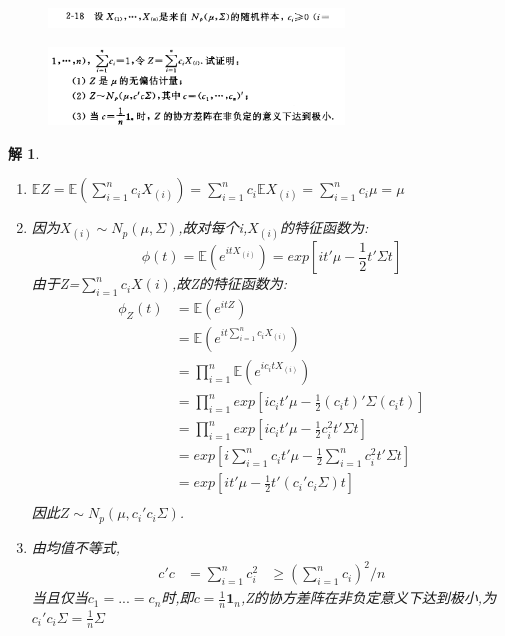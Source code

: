 \documentclass[11pt,a4paper]{ctexart}
\newtheorem*{solution}{解}
\begin{document}
\begin{figure}[H]
	\includegraphics[width=0.7\textwidth]{3.png}
\end{figure}
\begin{figure}[H]
	\includegraphics[width=0.7\textwidth]{4.png}
\end{figure}
\begin{solution}
\begin{enumerate}
	\item [(1)] 
	$ \mathbb{E}Z= \mathbb{E}(\sum_{i=1}^{n}c_iX_{(i)})=\sum_{i=1}^{n}c_i\mathbb{E}X_{(i)}=\sum_{i=1}^{n}c_i\mu=\mu$
	\item [(2)] 因为$ X_{(i)}\sim N_p(\mu,\Sigma) $,故对每个i,$ X_{(i)} $的特征函数为:
	\begin{equation}
	\phi(t)=\mathbb{E}(e^{itX_{(i)}})=exp\left[ it'\mu-\frac{1}{2}t'\Sigma t\right] 
	\end{equation}
	由于Z=$\sum_{i=1}^{n}c_iX(i) $,故Z的特征函数为:
	\begin{equation}
	\begin{aligned}
	\phi_Z(t) &=\mathbb{E}(e^{itZ})\\
	&= \mathbb{E}(e^{it\sum_{i=1}^{n}c_iX_{(i)}})\\
	&= \prod_{i=1}^{n}\mathbb{E}(e^{ic_itX_{(i)}})\\
	&= \prod_{i=1}^{n}exp\left[ ic_it'\mu-\frac{1}{2}(c_it)'\Sigma (c_it)\right] \\
	&= \prod_{i=1}^{n}exp\left[ ic_it'\mu-\frac{1}{2}c_i^2t'\Sigma t\right] \\
	&= exp\left[ i\sum_{i=1}^{n}c_it'\mu-\frac{1}{2}\sum_{i=1}^{n}c_i^2t'\Sigma t\right] \\
	&= exp\left[ it'\mu-\frac{1}{2}t'(c_i'c_i\Sigma )t\right] \\
	\end{aligned}
	\end{equation}
因此$ Z\sim N_p(\mu,c_i'c_i\Sigma) $.
	\item [(3)] 由均值不等式,
		\begin{equation}
		\begin{aligned}
		c'c &= \sum_{i=1}^{n}c_i^2
		&\geq (\sum_{i=1}^{n}c_i)^2/n
		\end{aligned}
    	\end{equation}
	当且仅当$ c_1=...=c_n $时,即$ c=\frac{1}{n}\textbf{1}_n $,Z的协方差阵在非负定意义下达到极小,为$ c_i'c_i\Sigma = \frac{1}{n}\Sigma $
\end{enumerate}
\end{solution}
\end{document}
